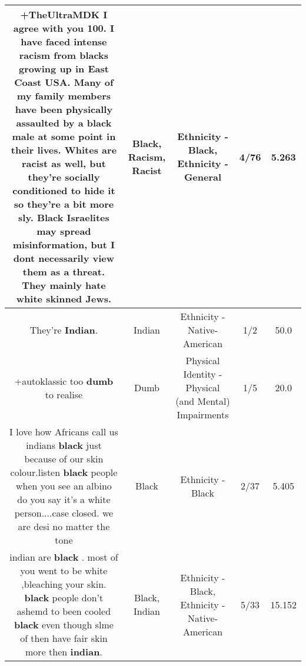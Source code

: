\documentclass[11pt]{article}
\newlength\mylength
\begin{document}
\begin{center}
\begin{longtable}{|C{.65\mylength}|C{.30\mylength}|C{.12\mylength}|C{.12\mylength}|C{.12\mylength}|}
  \small +TheUltraMDK I agree with you 100. I have faced intense \textbf{racism} from blacks growing up in East Coast USA. Many of my family members have been physically assaulted by a \textbf{black} male at some point in their lives. Whites are \textbf{racist} as well, but they're socially conditioned to hide it so they're a bit more sly. \textbf{Black} Israelites may spread misinformation, but I dont necessarily view them as a threat. They mainly hate white skinned Jews.\normalsize   & Black, Racism, Racist & Ethnicity - Black, Ethnicity - General & 4/76 & 5.263 \\  \hline
  \small They're \textbf{Indian}.\normalsize   & Indian & Ethnicity - Native-American & 1/2 & 50.0 \\  \hline
  \small +autoklassic too \textbf{dumb} to realise\normalsize   & Dumb & Physical Identity - Physical (and Mental) Impairments & 1/5 & 20.0 \\  \hline
  \small I love how Africans call us indians \textbf{black} just because of our skin colour.listen \textbf{black} people when you see an albino do you say it's a white person....case closed. we are desi no matter the tone\normalsize   & Black & Ethnicity - Black & 2/37 & 5.405 \\  \hline
  \small indian are \textbf{black} . most of you went to be white ,bleaching your skin. \textbf{black} people don't ashemd to been cooled \textbf{black} even though slme of then have fair skin more then \textbf{indian}.\normalsize   & Black, Indian & Ethnicity - Black, Ethnicity - Native-American & 5/33 & 15.152 \\  \hline

\end{longtable}
\end{center}
\end{document}
